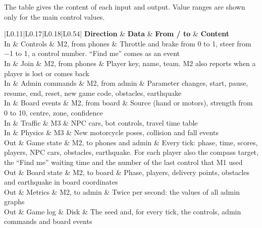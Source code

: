 \documentclass[
  english,
  10pt,
  a4paper,
]{article}
\newcommand{\ckkeep}[1]{\par\noindent\begin{minipage}{\linewidth}\setlength{\parskip}{4pt}#1\end{minipage}\par\smallskip}
\begin{document}
\ckkeep{%
The table gives the content of each input and output. Value ranges are shown only for the main
control values.

\begin{tabular}{|L{0.11}|L{0.17}|L{0.18}|L{0.54}|}
\hline \textbf{Direction} & \textbf{Data} & \textbf{From / to} & \textbf{Content} \\ \hline 
In & Controls & M2, from phones & Throttle and brake from 0 to 1, steer from −1 to 1, a control number. ``Find me'' comes as an event \\ \hline
In & Join & M2, from phones & Player key, name, team. M2 also reports when a player is lost or comes back \\ \hline
In & Admin commands & M2, from admin & Parameter changes, start, pause, resume, end, reset, new game code, obstacles, earthquake \\ \hline
In & Board events & M2, from board & Source (hand or motors), strength from 0 to 10, centre, zone, confidence \\ \hline
In & Traffic & M3 & NPC cars, bot controls, travel time table \\ \hline
In & Physics & M3 & New motorcycle poses, collision and fall events \\ \hline
Out & Game state & M2, to phones and admin & Every tick: phase, time, scores, players, NPC cars, obstacles, earthquake. For each player also the compass target, the ``Find me'' waiting time and the number of the last control that M1 used \\ \hline
Out & Board state & M2, to board & Phase, players, delivery points, obstacles and earthquake in board coordinates \\ \hline
Out & Metrics & M2, to admin & Twice per second: the values of all admin graphs \\ \hline
Out & Game log & Disk & The seed and, for every tick, the controls, admin commands and board events \\ \hline
\end{tabular}}

\end{document}
